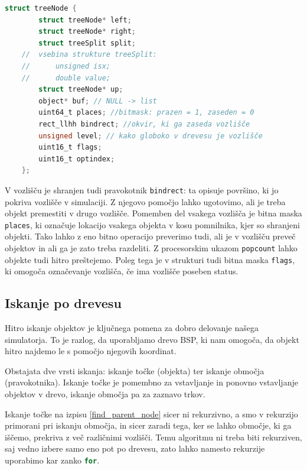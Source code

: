 \documentclass[a4paper,12pt]{article}
\begin{document}
\begin{lstlisting}[caption={Struktura vozlišča}, label=node_struct, language=C]
    struct treeNode {
        struct treeNode* left;
        struct treeNode* right;
        struct treeSplit split;
    //  vsebina strukture treeSplit:
    //      unsigned isx;
    //      double value;
        struct treeNode* up;
        object* buf; // NULL -> list
        uint64_t places; //bitmask: prazen = 1, zaseden = 0
        rect_llhh bindrect; //okvir, ki ga zaseda vozlišče
        unsigned level; // kako globoko v drevesu je vozlišče
        uint16_t flags;
        uint16_t optindex;
    };
\end{lstlisting}


V vozlišču je shranjen tudi pravokotnik \lstinline|bindrect|: ta opisuje površino, ki jo pokriva vozlišče v simulaciji.
Z njegovo pomočjo lahko ugotovimo, ali je treba objekt premestiti v drugo vozlišče.
Pomemben del vsakega vozlišča je bitna maska \lstinline|places|, ki označuje lokacijo vsakega objekta v kosu
pomnilnika, kjer so shranjeni objekti. Tako lahko z eno bitno operacijo preverimo tudi, ali je v vozlišču
preveč objektov in ali ga je zato treba razdeliti. Z procesorskim ukazom \lstinline|popcount| lahko objekte tudi
hitro preštejemo. Poleg tega je v strukturi tudi bitna maska \lstinline|flags|, ki omogoča označevanje vozlišča,
če ima vozlišče poseben status.

\subsection{Iskanje po drevesu}

Hitro iskanje objektov je ključnega pomena za dobro delovanje našega simulatorja.
To je razlog, da uporabljamo drevo BSP, ki nam omogoča, da objekt hitro najdemo le s
pomočjo njegovih koordinat.

Obstajata dve vrsti iskanja:
iskanje točke (objekta) ter iskanje območja (pravokotnika). Iskanje točke je pomembno za
vstavljanje in ponovno vstavljanje objektov v drevo, iskanje območja pa za zaznavo trkov.


Iskanje točke na izpisu \ref{find_parent_node} sicer ni rekurzivno, a smo v rekurzijo primorani
pri iskanju območja, in sicer zaradi tega, ker se lahko območje, ki ga iščemo, prekriva z več različnimi vozlišči.
Temu algoritmu ni treba biti rekurziven, saj vedno izbere samo eno pot po drevesu, zato lahko namesto
rekurzije uporabimo kar zanko \lstinline[language=C]{for}.
\end{document}
